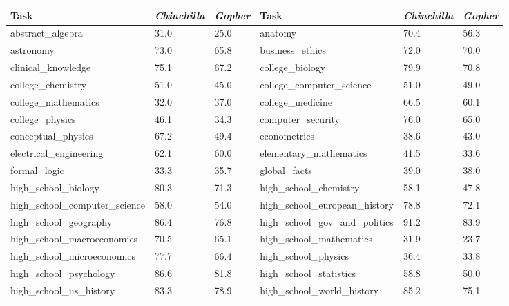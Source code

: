 \documentclass[11pt, a4paper, logo, copyright, nonumbering]{deepmind}
\newcommand{\gopher}{\textit{Gopher}\xspace}
\newcommand{\chinchilla}{\textit{Chinchilla}\xspace}
\begin{document}
\begin{table}[h!]
\centering
\small
\begin{tabular}{lll|lll}
\toprule
                            Task &     \chinchilla &     \gopher &                                    Task &     \chinchilla &     \gopher \\
\midrule
             abstract\_algebra &  31.0 &  25.0 &                              anatomy &  70.4 &  56.3 \\
                    astronomy &  73.0 &  65.8 &                      business\_ethics &  72.0 &  70.0 \\
           clinical\_knowledge &  75.1 &  67.2 &                      college\_biology &  79.9 &  70.8 \\
            college\_chemistry &  51.0 &  45.0 &             college\_computer\_science &  51.0 &  49.0 \\
          college\_mathematics &  32.0 &  37.0 &                     college\_medicine &  66.5 &  60.1 \\
              college\_physics &  46.1 &  34.3 &                    computer\_security &  76.0 &  65.0 \\
           conceptual\_physics &  67.2 &  49.4 &                         econometrics &  38.6 &  43.0 \\
       electrical\_engineering &  62.1 &  60.0 &               elementary\_mathematics &  41.5 &  33.6 \\
                 formal\_logic &  33.3 &  35.7 &                         global\_facts &  39.0 &  38.0 \\
          high\_school\_biology &  80.3 &  71.3 &                high\_school\_chemistry &  58.1 &  47.8 \\
 high\_school\_computer\_science &  58.0 &  54.0 &         high\_school\_european\_history &  78.8 &  72.1 \\
        high\_school\_geography &  86.4 &  76.8 &  high\_school\_gov\_and\_politics &  91.2 &  83.9 \\
   high\_school\_macroeconomics &  70.5 &  65.1 &              high\_school\_mathematics &  31.9 &  23.7 \\
   high\_school\_microeconomics &  77.7 &  66.4 &                  high\_school\_physics &  36.4 &  33.8 \\
       high\_school\_psychology &  86.6 &  81.8 &               high\_school\_statistics &  58.8 &  50.0 \\
       high\_school\_us\_history &  83.3 &  78.9 &            high\_school\_world\_history &  85.2 &  75.1 \\

\end{tabular}
\end{table}
\end{document}
